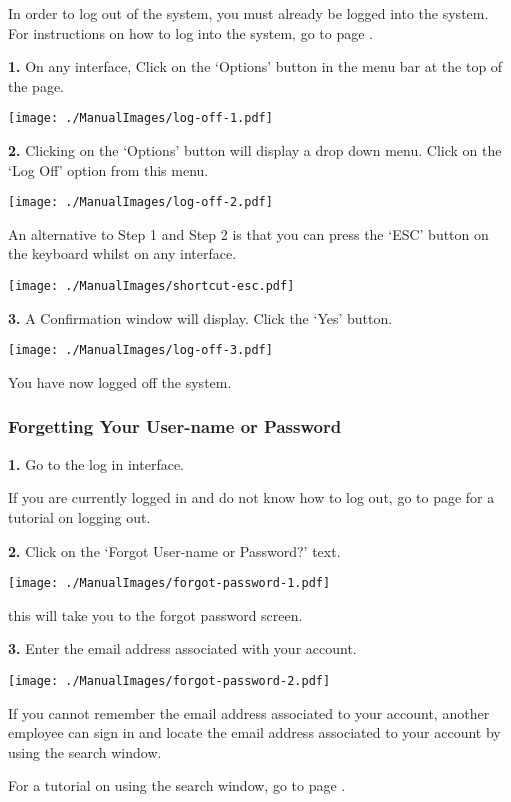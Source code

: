 In order to log out of the system, you must already be logged into the system. For instructions on how to log into the system, go to page \pageref{fig:Logging into the system}.

\textbf{1.}  On any interface, Click on the `Options' button in the menu bar at the top of the page.

\texttt{[image: ./ManualImages/log-off-1.pdf]}

\textbf{2.} Clicking on the `Options' button will display a drop down menu. Click on the `Log Off' option from this menu.

\texttt{[image: ./ManualImages/log-off-2.pdf]}

An alternative to Step 1 and Step 2 is that you can press the `ESC' button on the keyboard whilst on any interface.

\texttt{[image: ./ManualImages/shortcut-esc.pdf]}

\textbf{3.} A Confirmation window will display. Click the `Yes' button.

\texttt{[image: ./ManualImages/log-off-3.pdf]}

You have now logged off the system.

\pagebreak
\subsubsection{Forgetting Your User-name or Password}
\label{fig:Forgetting Your User-name or Password}

\textbf{1.} Go to the log in interface.

If you are currently logged in and do not know how to log out, go to page \pageref{fig:Logging out of the system}  for a tutorial on logging out.

\textbf{2.} Click on the `Forgot User-name or Password?' text.

\texttt{[image: ./ManualImages/forgot-password-1.pdf]}

this will take you to the forgot password screen.

\textbf{3.} Enter the email address associated with your account.

\texttt{[image: ./ManualImages/forgot-password-2.pdf]}

If you cannot remember the email address associated to your account, another employee can sign in and locate the email address associated to your account by using the search window.

For a tutorial on using the search window, go to page .

